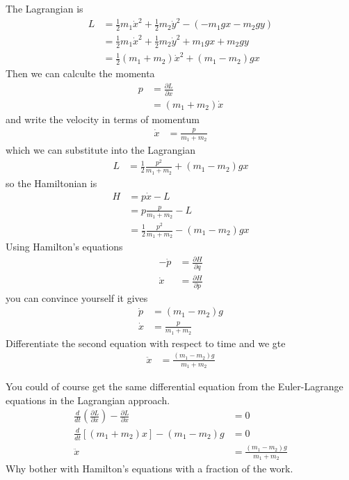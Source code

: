 The Lagrangian is
\begin{align}
    L &=
    \frac{1}{2}m_1\dot{x}^2
    +
    \frac{1}{2}m_2 \dot{y}^2
    - \left( 
    -m_1 gx
    - m_2 gy
    \right)\\
    &=
    \frac{1}{2}m_1\dot{x}^2 + \frac{1}{2}m_2\dot{y}^2
    + m_1 gx + m_2gy\\
    &=
    \frac{1}{2}\left( m_1 + m_2 \right) \dot{x}^2
    +
    \left( m_1 - m_2 \right) gx
\end{align}
Then we can calculte the momenta
\begin{align}
    p &= \frac{\partial L}{\partial x}\\
    &=
    \left( m_1 + m_2 \right)\dot{x}
\end{align}
and write the velocity in terms of momentum
\begin{align}
    \dot{x} &= \frac{p}{m_1 + m_2}
\end{align}
which we can substitute into the Lagrangian
\begin{align}
    L &=
    \frac{1}{2} \frac{p^2}{m_1 + m_2}
    +
    \left( m_1 - m_2 \right)gx
\end{align}
so the Hamiltonian is
\begin{align}
    H &= p\dot{x} - L\\
    &=
    p \frac{p}{m_1 + m_2} - L\\
    &=
    \frac{1}{2}\frac{p^2}{m_1 + m_2}
    -
    \left( m_1 - m_2 \right)gx
\end{align}
Using Hamilton's equations
\begin{align}
    -\dot{p} &= \frac{\partial H}{\partial q}\\
    \dot{x} &= \frac{\partial H}{\partial p}
\end{align}
you can convince yourself it gives
\begin{align}
    \dot{p} &= \left( m_1 - m_2 \right)g\\
    \dot{x} &= \frac{p}{m_1 + m_2}
\end{align}
Differentiate the second equation with respect to time and we gte
\begin{align}
    \ddot{x} &=
    \frac{\left( m_1 - m_2 \right)g}{m_1 + m_2}
\end{align}

You could of course get the same differential equation from the Euler-Lagrange
equations in the Lagrangian approach.
\begin{align}
    \frac{d}{dt}\left( \frac{\partial L}{\partial \dot{x}} \right)
    - \frac{\partial L}{\partial x} &= 0\\
    \frac{d}{dt}\left[ 
    \left( m_1 + m_2 \right)x
    \right]
    -
    \left( m_1 - m_2 \right)g
    &= 0\\
    \ddot{x} &=
    \frac{\left( m_1 - m_2 \right)g}{m_1 + m_2}
\end{align}
Why bother with Hamilton's equations with a fraction of the work.

